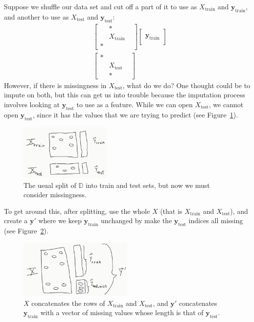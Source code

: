\documentclass[12pt, a4paper]{article}
\theoremstyle{definition}
\begin{document}
	Suppose we shuffle our data set and cut off a part of it to use as
	$X_{\text{train}}$ and $\bm{y}_{\text{train}}$, and another to use as
	$X_{\text{test}}$ and $\bm{y}_{\text{test}}$:
	\begin{align*}
		&\begin{bmatrix}
			{} & * & {}\\
			{} & X_{\text{train}} & {}\\
			* & {} & {}
		\end{bmatrix}
		\begin{bmatrix}
			{}\\
			\bm{y}_{\text{train}}\\
			{}
		\end{bmatrix}\\
		&\begin{bmatrix}
			* & {} & {}\\
			{} & X_{\text{test}} & {}\\
			{} & * & {}
		\end{bmatrix}
	\end{align*}
	However, if there is missingness
	in $X_{\text{test}}$, what do we do? One thought could be to impute on
	both, but this can get us into trouble because the imputation process involves
	looking at $\bm{y}_{\text{test}}$ to use as a feature. While we can open
	$X_{\text{test}}$, we cannot open $\bm{y}_{\text{test}}$, since it has the
	values that we are trying to predict (see Figure~\ref{fig:train-test-split-missing}).
	\begin{figure}
		\centering
		\includegraphics[width=0.4\textwidth]{train-test-split-missingness}
		\caption{The usual split of $\mathbb{D}$ into train and test sets,
		but now we must consider missingness.}
		\label{fig:train-test-split-missing}
	\end{figure}
	To get around this, after splitting, use the whole $X$ (that is $X_{\text{train}}$ and
	$X_{\text{test}}$), and create a $\bm{y}'$ where we keep $\bm{y}_{\text{train}}$
	unchanged by make the $\bm{y}_{\text{test}}$ indices all missing
	(see Figure~\ref{fig:treat-ytest-missing-then-impute}).
	\begin{figure}
		\centering
		\includegraphics[width=0.5\textwidth]{treating-ytest-as-missing-then-imputing}
		\caption{$X$ concatenates the rows of $X_{\text{train}}$ and $X_{\text{test}}$,
		and $\bm{y}'$ concatenates $\bm{y}_{\text{train}}$ with a vector of missing values
		whose length is that of $\bm{y}_{\text{test}}$.}
		\label{fig:treat-ytest-missing-then-impute}
	\end{figure}
\end{document}
